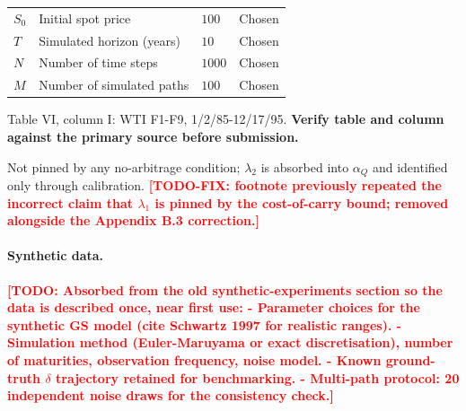 \documentclass[11pt, a4paper]{article}
\newcommand{\todo}[1]{\textcolor{red}{\textbf{[TODO: #1]}}}
\newcommand{\convyield}{\delta}             %
\begin{document}
\begin{table}[htbp]
\begin{threeparttable}
\begin{tabular}{llll}
$S_0$        & Initial spot price                    & $100$    & Chosen \\
$T$          & Simulated horizon (years)              & $10$     & Chosen \\
$N$          & Number of time steps                   & $1000$   & Chosen \\
$M$          & Number of simulated paths               & $100$    & Chosen \\
\bottomrule
\end{tabular}
\begin{tablenotes}
\footnotesize
\item[a] Table VI, column I: WTI F1-F9, 1/2/85-12/17/95. \textbf{Verify table and column against the primary source before submission.}
\item[b] Not pinned by any no-arbitrage condition; $\lambda_2$ is absorbed into $\alpha_Q$ and identified only through calibration. \textcolor{red}{\textbf{[TODO-FIX: footnote previously repeated the incorrect claim that $\lambda_1$ is pinned by the cost-of-carry bound; removed alongside the Appendix B.3 correction.]}}
\end{tablenotes}
\end{threeparttable}
\end{table}


\paragraph{Synthetic data.}
\todo{Absorbed from the old synthetic-experiments section so the data is
  described once, near first use:
  - Parameter choices for the synthetic GS model (cite Schwartz 1997 for
    realistic ranges).
  - Simulation method (Euler-Maruyama or exact discretisation), number of
    maturities, observation frequency, noise model.
  - Known ground-truth $\convyield$ trajectory retained for benchmarking.
  - Multi-path protocol: 20 independent noise draws for the consistency check.}
\end{document}
